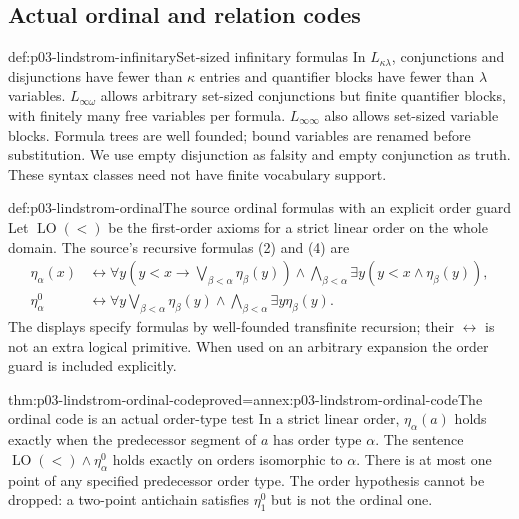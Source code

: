 \subsection{Actual ordinal and relation codes}

\begin{hbdefinition}{def:p03-lindstrom-infinitary}{Set-sized infinitary formulas}
In \(L_{\kappa\lambda}\), conjunctions and disjunctions have fewer than
\(\kappa\) entries and quantifier blocks have fewer than \(\lambda\)
variables. \(L_{\infty\omega}\) allows arbitrary set-sized conjunctions
but finite quantifier blocks, with finitely many free variables per formula.
\(L_{\infty\infty}\) also allows set-sized variable blocks. Formula
trees are well founded; bound variables are renamed before substitution.
We use empty disjunction as falsity and empty conjunction as truth.
These syntax classes need not have finite vocabulary support.
\end{hbdefinition}

\begin{hbdefinition}{def:p03-lindstrom-ordinal}{The source ordinal formulas with an explicit order guard}
Let \(\operatorname{LO}(<)\) be the first-order axioms for a strict linear
order on the whole domain. The source's recursive formulas (2) and (4) are
\[
\begin{split}
 \eta_\alpha(x)&\leftrightarrow
 \forall y\left(y<x\to\bigvee_{\beta<\alpha}\eta_\beta(y)\right)
       \land\bigwedge_{\beta<\alpha}\exists y(y<x\land\eta_\beta(y)),\\
 \eta^0_\alpha&\leftrightarrow
 \forall y\bigvee_{\beta<\alpha}\eta_\beta(y)
       \land\bigwedge_{\beta<\alpha}\exists y\eta_\beta(y).
\end{split}
\]
The displays specify formulas by well-founded transfinite recursion; their
\(\leftrightarrow\) is not an extra logical primitive. When used on an
arbitrary expansion the order guard is included explicitly.
\end{hbdefinition}

\begin{hbtheorem}{thm:p03-lindstrom-ordinal-code}{proved=annex:p03-lindstrom-ordinal-code}{The ordinal code is an actual order-type test}
In a strict linear order, \(\eta_\alpha(a)\) holds exactly when the
predecessor segment of \(a\) has order type \(\alpha\).
The sentence \(\operatorname{LO}(<)\land\eta^0_\alpha\) holds exactly
on orders isomorphic to \(\alpha\). There is at most one point of any
specified predecessor order type. The order hypothesis cannot be dropped:
a two-point antichain satisfies \(\eta^0_1\) but is not the ordinal one.
\end{hbtheorem}

